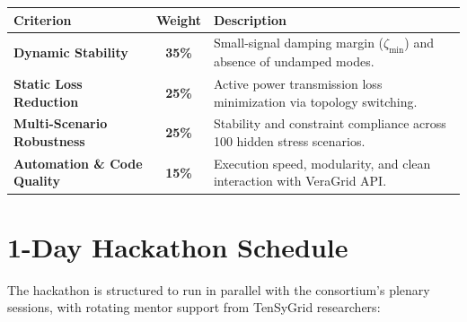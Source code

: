 \documentclass[11pt,a4paper]{article}
\begin{document}
\begin{table}[H]
  \centering
  \small
  \begin{tabularx}{\textwidth}{lcX}
    \toprule
    \textbf{\color{tgblue}Criterion} & \textbf{\color{tgblue}Weight} & \textbf{\color{tgblue}Description} \\
    \midrule
    \textbf{Dynamic Stability} & \textbf{35\%} & Small-signal damping margin ($\zeta_{\min}$) and absence of undamped modes. \\
    \textbf{Static Loss Reduction} & \textbf{25\%} & Active power transmission loss minimization via topology switching. \\
    \textbf{Multi-Scenario Robustness} & \textbf{25\%} & Stability and constraint compliance across 100 hidden stress scenarios. \\
    \textbf{Automation \& Code Quality} & \textbf{15\%} & Execution speed, modularity, and clean interaction with VeraGrid API. \\
    \bottomrule
  \end{tabularx}
\end{table}

\section{1-Day Hackathon Schedule}

The hackathon is structured to run in parallel with the consortium's plenary sessions, with rotating mentor support from TenSyGrid researchers:
\end{document}
